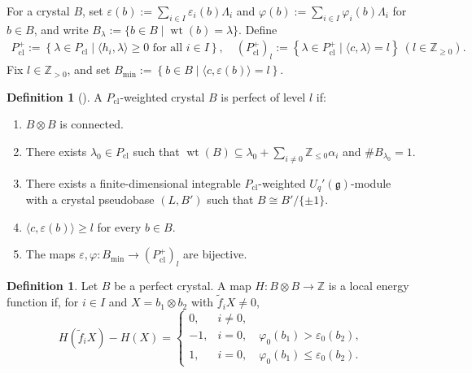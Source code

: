 \documentclass[11pt,reqno]{amsart}
\newcommand{\wt}{\operatorname{wt}}
\numberwithin{table}{section}
\numberwithin{equation}{section}
\theoremstyle{plain}
\theoremstyle{definition}
\newtheorem{definition}[theorem]{Definition}
\begin{document}
For a crystal \(B\), set $\varepsilon(b)
:=
\sum_{i\in I}\varepsilon_i(b)\Lambda_i$ and $\varphi(b)
:=
\sum_{i\in I}\varphi_i(b)\Lambda_i$ for $b\in B$,
and write
\(B_\lambda:=\{b\in B\mid\wt(b)=\lambda\}\).
Define
\[
\begin{aligned}
	P_{\mathrm{cl}}^+
	:=
	\left\{
	\lambda\in P_{\mathrm{cl}}
	\mid
	\langle h_i,\lambda\rangle\ge0
	\text{ for all }i\in I
	\right\},\quad
	(P_{\mathrm{cl}}^+)_l
	:=
	\left\{
	\lambda\in P_{\mathrm{cl}}^+
	\mid
	\langle c,\lambda\rangle=l
	\right\}
	\ (l\in\mathbb Z_{\ge0}).
\end{aligned}
\]
Fix \(l\in\mathbb Z_{>0}\), and set $B_{\min}
:=
\left\{
b\in B
\mid
\langle c,\varepsilon(b)\rangle=l
\right\}$.


\begin{definition}[{\cite[Definition~1.1.1]{KMN2}}]
	\label{def:perfect-crystal}
	A \(P_{\mathrm{cl}}\)-weighted crystal \(B\) is perfect of level
	\(l\) if:
	\begin{enumerate}
		\item[\textup{(P1)}]
		\(B\otimes B\) is connected.
		
		\item[\textup{(P2)}]
		There exists \(\lambda_0\in P_{\mathrm{cl}}\) such that $\wt(B)
		\subseteq
		\lambda_0+\sum_{i\ne0}\mathbb Z_{\le0}\alpha_i$ and $\#B_{\lambda_0}=1$.
	
		\item[\textup{(P3)}]
		There exists a finite-dimensional integrable
		\(P_{\mathrm{cl}}\)-weighted \(U_q'(\mathfrak g)\)-module
		with a crystal pseudobase \((L,B')\) such that
		\(B\cong B'/\{\pm1\}\).
		
		\item[\textup{(P4)}]
		\(\langle c,\varepsilon(b)\rangle\ge l\) for every \(b\in B\).
		
		\item[\textup{(P5)}]
		The maps
		\(\varepsilon,\varphi:
		B_{\min}\longrightarrow(P_{\mathrm{cl}}^+)_l\)
		are bijective.
	\end{enumerate}
\end{definition}

\begin{definition}\label{def:energy}
	Let \(B\) be a perfect crystal.
	A map \(H:B\otimes B\longrightarrow\mathbb Z\) is a local energy
	function if, for \(i\in I\) and \(X=b_1\otimes b_2\) with
	\(\widetilde f_iX\ne0\),
	\begin{equation}\label{eq:energy-def}
		H(\widetilde f_iX)-H(X)
		=
		\begin{cases}
			0,
			&i\ne0,\\
			-1,
			&i=0,\quad
			\varphi_0(b_1)>\varepsilon_0(b_2),\\
			1,
			&i=0,\quad
			\varphi_0(b_1)\le\varepsilon_0(b_2).
		\end{cases}
	\end{equation}
\end{definition}
\end{document}
